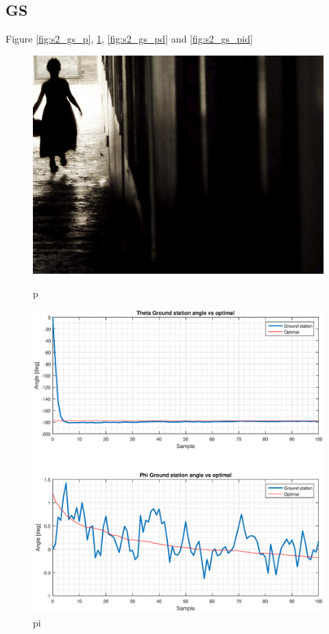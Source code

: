 \subsection{GS}
Figure \ref{fig:s2_gs_p}, \ref{fig:s2_gs_pi}, \ref{fig:s2_gs_pd} and \ref{fig:s2_gs_pid}

\begin{figure}[H]
\begin{minipage}[t]{0.45\textwidth}
\includegraphics[width=\linewidth]{figures/randomfigure.jpg}
\caption{p}
\label{fig:s2_gs_p}
\end{minipage}
\hspace{\fill}
\begin{minipage}[t]{0.45\textwidth}
\includegraphics[width=\linewidth]{figures/s2_pi_gs_theta_phi_optimal.eps}
\caption{pi}
\label{fig:s2_gs_pi}
\end{minipage}


\end{figure}
